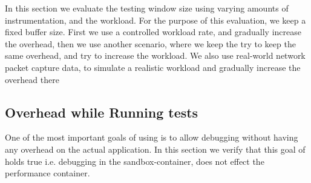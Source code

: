 In this section we evaluate the testing window size using varying amounts of instrumentation, and the workload.
For the purpose of this evaluation, we keep a fixed buffer size. 
First we use a controlled workload rate, and gradually increase the overhead, then we use another scenario, where we keep the try to keep the same overhead, and try to increase the workload.
We also use real-world network packet capture data, to simulate a realistic workload and gradually increase the overhead there

\subsection{Overhead while Running tests}
\label{sec:overhead}

One of the most important goals of using \parikshan is to allow debugging without having any overhead on the actual application.
In this section we verify that this goal of \parikshan holds true i.e. debugging in the sandbox-container, does not effect the performance container. 